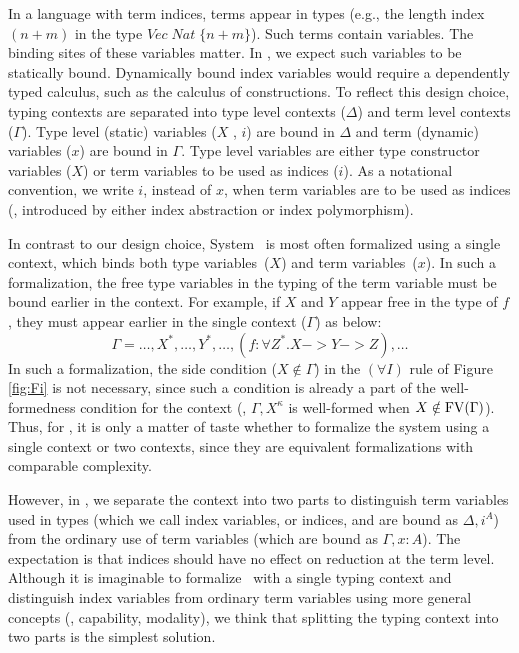 In a language with term indices, terms appear in types (e.g., the length index
$(n+m)$ in the type $\textit{Vec}\;\textit{Nat}\;\{n+m\}$).
Such terms contain variables. The binding sites of these variables matter.
In \Fi, we expect such variables to be statically bound. Dynamically bound
index variables would require a dependently typed calculus, such as
the calculus of constructions. To reflect this design choice,
typing contexts are separated into type level contexts ($\Delta$) and
term level contexts ($\Gamma$). Type level (static) variables ($X$ , $i$) are
bound in $\Delta$ and term (dynamic) variables ($x$) are bound in $\Gamma$.
Type level variables are either type constructor variables ($X$) or
term variables to be used as indices ($i$). As a notational convention,
we write $i$, instead of $x$, when term variables are to be used as indices
(\ie, introduced by either index abstraction or index polymorphism).

In contrast to our design choice, System \Fw\ is most often formalized using
a single context, which binds both type variables~($X$) and term 
variables~($x$). 
In such a formalization, the free type variables in the typing of
the term variable must be bound earlier in the context. For example,
if $X$ and $Y$ appear free in the type of $f$, they must appear earlier
in the single context ($\Gamma$) as below:
\[ \Gamma = \dots,X^{\mathtt*},\dots,Y^{\mathtt*},\dots,
		(f:\forall Z^{\mathtt*}.X -> Y -> Z),\dots \]
In such a formalization, the side condition ($X\notin\Gamma$)
in the $(\forall I)$ rule of Figure \ref{fig:Fi} is not necessary,
since such a condition is already a part of the well-formedness condition
for the context (\ie, $\Gamma,X^\kappa$ is well-formed when
$X\notin\mathop{\mathrm{FV}}(\Gamma)$). Thus, for \Fw, it is only a matter of taste
whether to formalize the system using a single context or two contexts,
since they are equivalent formalizations with comparable complexity.

However, in \Fi, we separate the context into two parts to distinguish
term variables used in types (which we call index variables, or indices,
and are bound as $\Delta,i^A$) from the ordinary use of term variables
(which are bound as $\Gamma,x : A$). The expectation is that indices
should have no effect on reduction at the term level.
Although it is imaginable to formalize \Fi\ with a single typing context
and distinguish index variables from ordinary term variables using
more general concepts (\eg, capability, modality), we think that splitting
the typing context into two parts is the simplest solution.

